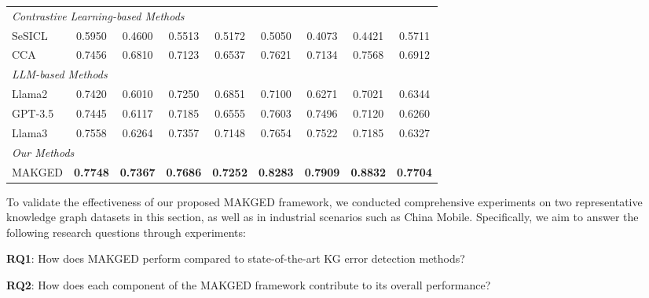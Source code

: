 \begin{table}[t]
\begin{center}
{\begin{tabular}{lcccccccc}
        \midrule
        \multicolumn{9}{l}{\textit{Contrastive Learning-based Methods}} \\

        SeSICL & 0.5950 & 0.4600 & 0.5513 & 0.5172 & 0.5050 & 0.4073 & 0.4421 & 0.5711 \\
        CCA & 0.7456 & 0.6810 & 0.7123 & 0.6537 & 0.7621 & 0.7134 & 0.7568 & 0.6912 \\ 

        \midrule
        \multicolumn{9}{l}{\textit{LLM-based Methods}} \\

        Llama2 & 0.7420 & 0.6010 & 0.7250 & 0.6851 & 0.7100 & 0.6271 & 0.7021 & 0.6344 \\  
        GPT-3.5 & 0.7445 & 0.6117 & 0.7185 & 0.6555 & 0.7603 & 0.7496 & 0.7120 & 0.6260 \\ 
        Llama3 & 0.7558 & 0.6264 & 0.7357 & 0.7148 & 0.7654 & 0.7522 & 0.7185 & 0.6327 \\
        
        \midrule
        \multicolumn{9}{l}{\textit{Our Methods}} \\

        MAKGED & \textbf{0.7748} & \textbf{0.7367} & \textbf{0.7686} & \textbf{0.7252} & \textbf{0.8283} & \textbf{0.7909} & \textbf{0.8832} & \textbf{0.7704} \\


        \bottomrule

        \end{tabular}
    }
\end{center}
\end{table}


To validate the effectiveness of our proposed MAKGED framework, we conducted comprehensive experiments on two representative knowledge graph datasets in this section, as well as in industrial scenarios such as China Mobile. Specifically, we aim to answer the following research questions through  experiments:

\noindent\textbf{RQ1}: How does MAKGED perform compared to state-of-the-art KG error detection methods?

\noindent\textbf{RQ2}: How does each component of the MAKGED framework contribute to its overall performance?

